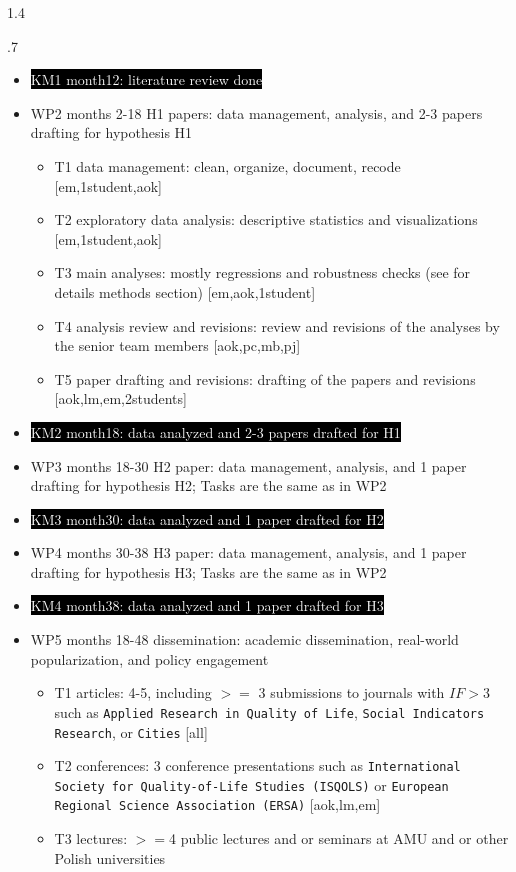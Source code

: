 \documentclass[10pt, letterpaper]{article}
\begin{document}
\begin{spacing}{1.4}
\begin{spacing}{.7}
\begin{itemize}
\item \colorbox{black}{\textcolor{white}{KM1 month12: literature review done}}
\item WP2 months 2-18 H1 papers: data management, analysis, and 2-3 papers drafting for hypothesis H1
  \begin{itemize}
  \item T1 data management: clean, organize, document, recode [em,1student,aok] 
  \item T2 exploratory data analysis: descriptive statistics and visualizations [em,1student,aok] 
  \item T3 main analyses: mostly regressions and robustness checks (see for
    details methods section) [em,aok,1student]
  \item T4 analysis review and revisions: review and revisions of the analyses by the senior team members [aok,pc,mb,pj]
  \item T5 paper drafting and revisions: drafting of the papers and revisions [aok,lm,em,2students] 
  \end{itemize}
\item \colorbox{black}{\textcolor{white}{KM2 month18: data analyzed and 2-3 papers drafted for H1}}
\item WP3 months 18-30 H2 paper: data management, analysis, and 1 paper drafting for
  hypothesis H2; Tasks are the same as in WP2
\item \colorbox{black}{\textcolor{white}{KM3 month30: data analyzed and 1 paper drafted for H2}}
\item WP4 months 30-38 H3 paper: data management, analysis, and 1 paper drafting for
  hypothesis H3; Tasks are the same as in WP2 
\item \colorbox{black}{\textcolor{white}{KM4 month38: data analyzed and 1 paper drafted for H3}}
\item WP5 months 18-48 dissemination: academic dissemination, real-world popularization, and policy engagement
  \begin{itemize}
  \item T1 articles: 4-5, including  $>=$ 3 submissions to journals with $IF>3$ such as
    \texttt{Applied Research in Quality of Life}, \texttt{Social Indicators
      Research}, or \texttt{Cities} [all]
  \item T2 conferences: 3 conference presentations such as  \texttt{International Society for
      Quality-of-Life Studies (ISQOLS)} or \texttt{European Regional Science
      Association (ERSA)} [aok,lm,em]
  \item T3 lectures:  $>=$4 public lectures and or seminars at AMU and or other Polish universities

\end{itemize}
\end{itemize}
\end{spacing}
\end{spacing}
\end{document}
